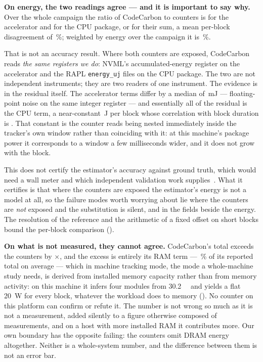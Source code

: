 \textbf{On energy, the two readings agree --- and it is important to say why.}
Over the whole campaign the ratio of CodeCarbon to counters is \vCCgpuRatio{}
for the accelerator and \vCCcpuRatio{} for the CPU package, or \vCCmeasRatio{}
for their sum, a mean per-block disagreement of \vCCmeasDisagreementPct\,\%;
weighted by energy over the campaign it is \vCCmeasWeightedPct\,\%.

That is not an accuracy result. Where both
counters are exposed, CodeCarbon reads \emph{the same registers we do}: NVML's
accumulated-energy register on the accelerator and the RAPL \texttt{energy\_uj}
files on the CPU package. The two are not independent instruments; they are two
readers of one instrument. The evidence is in the residual itself. The
accelerator terms differ by a median of \vOffsetGpuMedianMJ\,\si{\milli\joule}
--- floating-point noise on the same integer register --- and essentially all of
the residual is the CPU term, a near-constant \vOffsetCpuMedianJ\,\si{\joule}
per block whose correlation with block duration is \vOffsetDurationCorr. That
constant is the counter reads being nested immediately inside the tracker's own
window rather than coinciding with it: at this machine's package power it
corresponds to a window a few milliseconds wider, and it does not grow with the
block.


This does not certify the estimator's accuracy against ground truth, which would
need a wall meter and which independent validation work
supplies~\citep{fischer2026groundtruthing}. What it certifies is that where the
counters are exposed the estimator's energy is not a model at all, so the
failure modes worth worrying about lie where the counters are \emph{not} exposed
and the substitution is silent, and in the fields beside the energy. The
resolution of the reference and the arithmetic of a fixed offset on short blocks
bound the per-block comparison ().

\textbf{On what is not measured, they cannot agree.} CodeCarbon's total exceeds
the counters by \vCCtotalRatio$\times$, and the excess is entirely its RAM term
--- \vCCramSharePct\,\% of its reported total on average --- which in machine
tracking mode, the mode a whole-machine study needs, is derived from installed
memory capacity rather than from memory activity: on this machine it infers
four modules from \SI{30.2}{\giga\byte} and yields a flat \SI{20}{\watt} for
every block, whatever the workload does to memory (). No counter
on this platform can confirm or refute it. The number is not wrong so much as it
is not a measurement, added silently to a figure otherwise composed of
measurements, and on a host with more installed RAM it contributes more. Our
own boundary has the opposite failing: the counters omit DRAM energy
altogether. Neither is a whole-system number, and the difference between them
is not an error bar.


